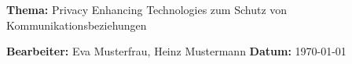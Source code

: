 \documentclass[fontsize=12pt,parskip=half]{scrartcl}
\begin{document}
\textbf{\textsf{Thema:}} Privacy Enhancing Technologies zum Schutz von Kommunikationsbeziehungen

\textbf{\textsf{Bearbeiter:}} Eva Musterfrau, Heinz Mustermann
\textbf{\textsf{Datum:}} \today
\nocite{*} 
\begin{raggedright}
  \printbibliography
\end{raggedright}
\end{document}
